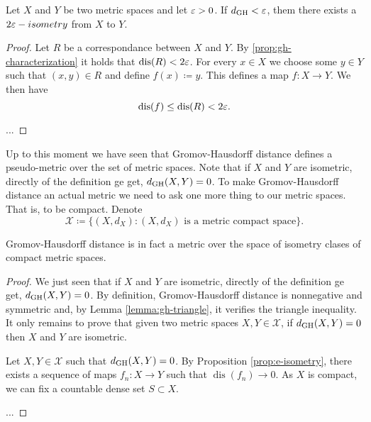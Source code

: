 \begin{proposition} \label{prop:e-isometry}
    Let $ X $ and $ Y $ be two metric spaces and let $ \varepsilon > 0 $. If $ d_{\operatorname{GH}} < \varepsilon $, them there exists a $ 2 \varepsilon -isometry $ from $ X $ to $ Y $.
\end{proposition}
\begin{proof}
    Let $ R $ be a correspondance between $ X $ and $ Y $. By \ref{prop:gh-characterization} it holds that $\operatorname{dis}(R) < 2 \varepsilon$. For every $ x \in X $ we choose some $ y \in Y $ such that $(x, y) \in R$ and define $ f(x) \coloneq y $. This defines a map $ f \colon X \to Y $. We then have
    \begin{equation}
        \operatorname{dis}(f) \leq \operatorname{dis}(R) < 2 \varepsilon.
    \end{equation}

    ...
\end{proof}

Up to this moment we have seen that Gromov-Hausdorff distance defines a pseudo-metric over the set of metric spaces. Note that if $ X $ and $ Y $ are isometric, directly of the definition ge get, $ d_{\operatorname{GH}}(X, Y) = 0 $. To make Gromov-Hausdorff distance an actual metric we need to ask one more thing to our metric spaces. That is, to be compact. Denote
\begin{equation}
    \mathcal{X} \coloneq \{ (X, d_X) \colon (X, d_X) \text{ is a metric compact space} \}.
\end{equation}

\begin{theorem} \label{theorem:gh-distance}
    Gromov-Hausdorff distance is in fact a metric over the space of isometry clases of compact metric spaces.    
\end{theorem}
\begin{proof}
    We just seen that if $ X $ and $ Y $ are isometric, directly of the definition ge get, $ d_{\operatorname{GH}}(X, Y) = 0 $. By definition, Gromov-Hausdorff distance is nonnegative and symmetric and, by Lemma \ref{lemma:gh-triangle}, it verifies the triangle inequality. It only remains to prove that given two metric spaces $ X, Y \in \mathcal{X} $, if $ d_{\operatorname{GH}}(X, Y) = 0 $ then $ X $ and $ Y $ are isometric.  
    
    Let  $ X, Y \in \mathcal{X} $ such that $ d_{\operatorname{GH}}(X, Y) = 0 $. By Proposition \ref{prop:e-isometry}, there exists a sequence of maps $ f_n \colon X \to Y $ such that $ \operatorname{dis}(f_n) \to 0 $. As $ X $ is compact, we can fix a countable dense set $ S \subset X $.
    
    ...
\end{proof}

